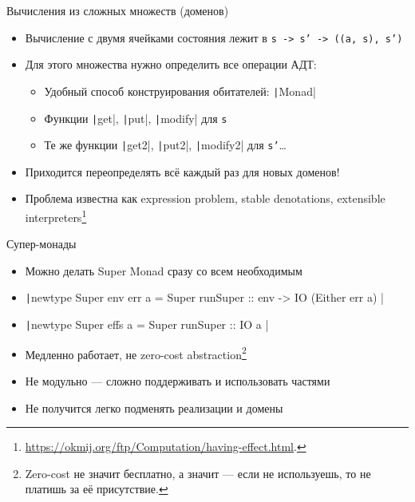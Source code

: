     \begin{frame}[fragile]{Вычисления из сложных множеств (доменов)}
        \begin{itemize}
            \item Вычисление с двумя ячейками состояния лежит в \texttt{s -> s' -> ((a, s), s')}
            \item Для этого множества нужно определить все операции АДТ:
            \begin{itemize}
                \item Удобный способ конструирования обитателей: \texttt|Monad|
                \item Функции \texttt|get|, \texttt|put|, \texttt|modify| для \texttt{s}
                \item Те же функции \texttt|get2|, \texttt|put2|, \texttt|modify2| для \texttt{s'}\ldots
            \end{itemize}
            \item[\NB] Приходится переопределять всё каждый раз для новых доменов!
            \item Проблема известна как expression problem, stable denotations, extensible interpreters\footnote{\color{blue} \url{https://okmij.org/ftp/Computation/having-effect.html}.}
        \end{itemize}
    \end{frame}

    \begin{frame}[fragile]{Супер-монады \popslide}
        \begin{itemize}
            \item Можно делать Super Monad сразу со всем необходимым
            \item[\eg] \texttt|newtype Super env err a = Super { runSuper :: env -> IO (Either err a) }|
            \item[\eg] \texttt|newtype Super effs a = Super { runSuper :: IO a }|
            \item[\negative] Медленно работает, не zero-cost abstraction\footnote{Zero-cost не значит бесплатно, а значит --- если не используешь, то не платишь за её присутствие.}
            \item[\negative] Не модульно --- сложно поддерживать и использовать частями
            \item[\negative] Не получится легко подменять реализации и домены
        \end{itemize}
    \end{frame}

